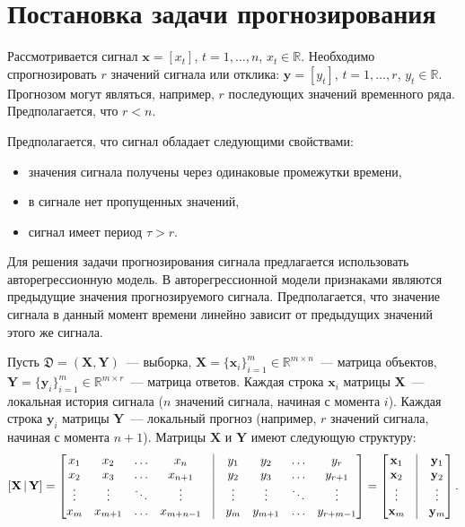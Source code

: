\documentclass[12pt,twoside]{article}
\newcommand{\bx}{\mathbf{x}}
\newcommand{\by}{\mathbf{y}}
\newcommand{\bY}{\mathbf{Y}}
\newcommand{\bX}{\mathbf{X}}
\begin{document}
\newpage
\section{Постановка задачи прогнозирования}
Рассмотривается сигнал $\mathbf{x} = [x_t]$,  $t = 1, \dots , n$, $x_t \in \mathbb{R}$. Необходимо спрогнозировать $r$ значений сигнала или отклика:  
$\mathbf{y} = [y_t]$,  $t = 1, \dots , r$, $y_t \in \mathbb{R}$. 
Прогнозом могут являться, например, $r$ последующих значений временного ряда. 
Предполагается, что $r < n$. 


Предполагается, что сигнал обладает следующими свойствами: 
\begin{itemize}
\item значения сигнала получены через одинаковые промежутки времени, 
\item в сигнале нет пропущенных значений,
\item сигнал имеет период $\tau > r$. 
\end{itemize}
Для решения задачи прогнозирования сигнала предлагается использовать авторегрессионную модель. 
В авторегрессионной модели признаками являются предыдущие значения прогнозируемого сигнала. 
Предполагается, что значение сигнала в данный момент времени линейно зависит от предыдущих значений этого же сигнала.

Пусть $\mathfrak{D}= \left( \bX, \bY \right)$~--- выборка, $\mathbf{X} = \{\bx_i\}_{i=1}^m \in \mathbb{R}^{m \times n}$~--- матрица объектов, $\mathbf{Y}= \{\by_i\}_{i=1}^m \in \mathbb{R}^{m \times r}$~--- матрица ответов. 
Каждая строка $\bx_i$ матрицы $\mathbf{X}$~--– локальная история сигнала ($n$ значений сигнала, начиная с момента $i$). 
Каждая строка $\by_i$ матрицы $\mathbf{Y}$~--– локальный прогноз (например, $r$ значений сигнала, начиная с момента $n+1$). Матрицы $\bX$ и $\bY$ имеют следующую структуру:
$$
\left[ \mathbf{X \, | \, Y} \right] = 
    \begin{bmatrix}
        x_1 & x_2 & \dots  & x_{n} & \vrule & y_1 & y_2 & \dots  & y_{r}\\
        x_2 & x_3 & \dots & x_{n + 1} & \vrule & y_2 & y_3 & \dots  & y_{r+1}\\
        \vdots & \vdots & \ddots & \vdots & \vrule & \vdots & \vdots & \ddots & \vdots \\
        x_{m} & x_{m+1} & \dots  & x_{m+n-1} & \vrule & y_{m} & y_{m+1} & \dots  & y_{r+m-1}
    \end{bmatrix} = 
    \begin{bmatrix}
        \bx_1 & \vrule & \by_1\\
        \bx_2 &\vrule & \by_2\\
        \vdots & \vrule &  \vdots \\
        \bx_m & \vrule & \by_m
    \end{bmatrix}.
$$
\end{document}
